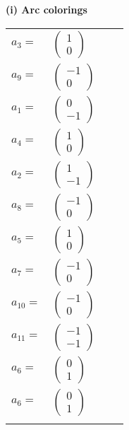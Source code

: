 \documentclass[1p]{elsarticle_modified}
\theoremstyle{definition}
\begin{document}
\flushleft \textbf{(i) Arc colorings}\\
\begin{tabular}{m{7pt} m{180pt} m{7pt} m{180pt} }
\flushright $a_{3}=$&$\begin{pmatrix}1\\0\end{pmatrix}$ \\
\flushright $a_{9}=$&$\begin{pmatrix}-1\\0\end{pmatrix}$ \\
\flushright $a_{1}=$&$\begin{pmatrix}0\\-1\end{pmatrix}$ \\
\flushright $a_{4}=$&$\begin{pmatrix}1\\0\end{pmatrix}$ \\
\flushright $a_{2}=$&$\begin{pmatrix}1\\-1\end{pmatrix}$ \\
\flushright $a_{8}=$&$\begin{pmatrix}-1\\0\end{pmatrix}$ \\
\flushright $a_{5}=$&$\begin{pmatrix}1\\0\end{pmatrix}$ \\
\flushright $a_{7}=$&$\begin{pmatrix}-1\\0\end{pmatrix}$ \\
\flushright $a_{10}=$&$\begin{pmatrix}-1\\0\end{pmatrix}$ \\
\flushright $a_{11}=$&$\begin{pmatrix}-1\\-1\end{pmatrix}$ \\
\flushright $a_{6}=$&$\begin{pmatrix}0\\1\end{pmatrix}$\\ \flushright $a_{6}=$&$\begin{pmatrix}0\\1\end{pmatrix}$\\&\end{tabular}
\end{document}
